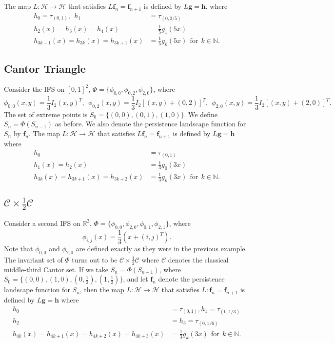 \documentclass [52pt] {article}
\newcommand{\R}{\mathbb{R}}
\newcommand{\Hil}{\mathcal{H}}
\begin{document}
The map $L:\Hil\to\Hil$ that satisfies $L\mathbf{f}_n = \mathbf{f}_{n+1}$ is defined by $L\mathbf{g} = \mathbf{h}$, where
\[\begin{split}
h_0 = \tau_{(0,1)},\:\: h_1 &= \tau_{(0,2/5)}\\
h_2(x) = h_3(x) = h_4(x) &= \frac{1}{5}g_1(5x)\\
h_{3k-1}(x) = h_{3k}(x) = h_{3k+1}(x) &= \frac{1}{5}g_k(5x)\:\:\text{for}\:\:k\in\mathbb{N}.
\end{split}\]

\subsection{Cantor Triangle}
Consider the IFS on $[0,1]^2$, $\Phi = \{\phi_{0,0}, \phi_{0,2},\phi_{2,0}\}$, where
\[\phi_{0,0}(x,y) = \frac{1}{3}I_2(x,y)^T,\:\:\phi_{0,2}(x,y) = \frac{1}{3}I_2[(x,y)+(0,2)]^T,\:\:\phi_{2,0}(x,y) = \frac{1}{3}I_2[(x,y)+(2,0)]^T.\]
The set of extreme points is $S_0 = \{(0,0), (0,1),(1,0)\}$.  We define $S_n = \Phi(S_{n-1})$ as before.  We also denote the persistence landscape function for $S_n$ by $\mathbf{f}_n$.  The map $L:\Hil\to\Hil$ that satisfies $L\mathbf{f}_n = \mathbf{f}_{n+1}$ is defined by $L\mathbf{g} = \mathbf{h}$ where
\[\begin{split}
h_0 &= \tau_{(0,1)}\\
h_1(x) = h_2(x) &= \frac{1}{3}g_0(3x)\\
h_{3k}(x) = h_{3k+1}(x) = h_{3k+2}(x) &= \frac{1}{3}g_k(3x)\:\:\text{for}\:\:k\in\mathbb{N}.
\end{split}\]

\subsection{$\mathcal{C}\times\frac{1}{2}\mathcal{C}$}
Consider a second IFS on $\R^2$, $\Phi = \{\phi_{0,0}, \phi_{2,0}, \phi_{0,1}, \phi_{2,1}\}$, where
\[\phi_{i,j}(x) = \frac{1}{3}\left(x+(i,j)^T\right).\]
Note that $\phi_{0,0}$ and $\phi_{2,0}$ are defined exactly as they were in the previous example.  The invariant set of $\Phi$ turns out to be $\mathcal{C}\times\frac{1}{2}\mathcal{C}$ where $\mathcal{C}$ denotes the classical middle-third Cantor set.  If we take $S_n = \Phi(S_{n-1})$, where $S_0 = \{(0,0),(1,0),(0,\frac{1}{2}), (1,\frac{1}{2})\}$, and let $\mathbf{f}_n$ denote the persistence landscape function for $S_n$, then the map $L:\Hil\to\Hil$ that satisfies $L:\mathbf{f}_n = \mathbf{f}_{n+1}$ is defined by $L\mathbf{g} = \mathbf{h}$ where\[\begin{split}
h_0 &= \tau_{(0,1)}, h_1 = \tau_{(0,1/3)}\\
h_2 &= h_3 = \tau_{(0,1/6)}\\
h_{4k}(x) = h_{4k+1}(x) = h_{4k+2}(x) = h_{4k+3}(x) &= \frac{1}{3}g_k(3x)\:\:\text{for}\:\:k\in\mathbb{N}.
\end{split}\]
\end{document}
